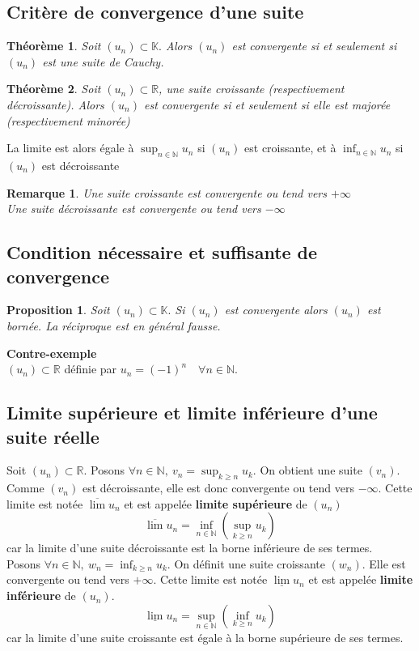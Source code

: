 \documentclass[11pt, a4paper]{book}
\newtheorem{teo}{Th\'eor\`eme}[section]
\newtheorem{pro}{Proposition}[section]
\newtheorem{rem}{Remarque}[section]
\begin{document}
\subsection{Crit\`ere de convergence d'une suite }
\begin{teo}
Soit $(u_{n}) \subset \mathbb{K}.$ Alors $(u_{n})$ est convergente si et seulement si $(u_{n})$ est une suite de Cauchy.
\end{teo}
\begin{teo} Soit $(u_{n}) \subset \mathbb{R}$, une suite croissante (respectivement d\'ecroissante). Alors $(u_{n})$ est convergente si et seulement si elle est major\'ee  (respectivement minor\'ee) \end{teo}
La limite est alors \'egale \`a ${\displaystyle \sup_{n \in \mathbb{N} } u_{n}}$ si $(u_{n})$ est croissante, et \`a ${\displaystyle \inf_{n \in \mathbb{N} } u_{n}}$ si $(u_{n})$ est d\'ecroissante
\begin{rem} Une suite croissante est convergente ou tend vers $+ \infty$ \\
Une suite d\'ecroissante est convergente ou tend vers $-\infty$ \end{rem}

\subsection{Condition n\'ecessaire et suffisante de convergence}
\begin{pro} Soit $(u_{n}) \subset \mathbb{K}.$ Si $(u_{n})$ est convergente alors $(u_{n})$ est born\'ee. La r\'eciproque est en g\'en\'eral fausse. \end{pro}
\textbf{Contre-exemple}\\
$(u_{n}) \subset \mathbb{R} $ d\'efinie par $ u_{n}=(-1)^{n} \quad \forall n \in \mathbb{N}. $

\subsection*{Limite sup\'erieure et limite inf\'erieure d'une suite r\'eelle}
Soit $(u_{n}) \subset \mathbb{R}$. Posons $\forall	n \in \mathbb{N},~{\displaystyle v_{n}=\sup_{k \geq n} u_{k}}$. On obtient une suite $(v_{n})$. Comme $(v_{n})$ est d\'ecroissante, elle est donc convergente ou tend vers $- \infty.$ Cette limite est not\'ee ${\displaystyle  \overline{\lim } u_{n}}$ et est appel\'ee \textbf{limite sup\'erieure} de $(u_{n})$\\
$$ \overline{\lim} u_{n} =\inf_{n \in \mathbb{N} }(\sup_{k \geq n}u_{k})$$ car la limite d'une suite d\'ecroissante est la borne inf\'erieure de ses termes.\\
     Posons $\forall n \in \mathbb{N},~{\displaystyle  w_{n}=\inf_{k \geq n}u_{k}}.$ On d\'efinit une suite croissante $(w_{n}).$ Elle est convergente ou tend vers $+\infty.$ Cette limite est not\'ee ${\displaystyle  \underline{\lim}u_{n}}$ et est appel\'ee \textbf{limite inf\'erieure} de $(u_{n}).$
     $$ \underline{\lim}u_{n}=\sup_{n \in \mathbb{N} }(\inf_{k \geq n} u_{k})$$
car la limite d'une suite croissante est \'egale \`a la borne sup\'erieure de ses termes.\\
\end{document}
